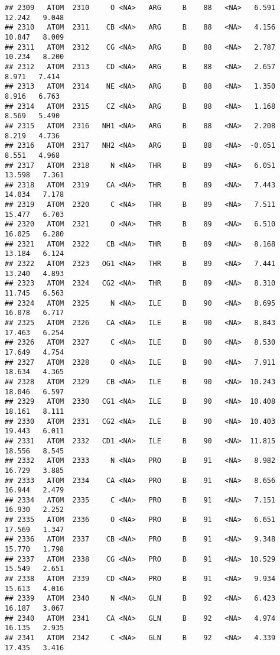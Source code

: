 \documentclass[
]{article}
\begin{document}
\begin{verbatim}
## 2309   ATOM  2310     O <NA>   ARG     B    88   <NA>   6.591  12.242   9.048
## 2310   ATOM  2311    CB <NA>   ARG     B    88   <NA>   4.156  10.847   8.009
## 2311   ATOM  2312    CG <NA>   ARG     B    88   <NA>   2.787  10.234   8.200
## 2312   ATOM  2313    CD <NA>   ARG     B    88   <NA>   2.657   8.971   7.414
## 2313   ATOM  2314    NE <NA>   ARG     B    88   <NA>   1.350   8.916   6.763
## 2314   ATOM  2315    CZ <NA>   ARG     B    88   <NA>   1.168   8.569   5.490
## 2315   ATOM  2316   NH1 <NA>   ARG     B    88   <NA>   2.208   8.219   4.736
## 2316   ATOM  2317   NH2 <NA>   ARG     B    88   <NA>  -0.051   8.551   4.968
## 2317   ATOM  2318     N <NA>   THR     B    89   <NA>   6.051  13.598   7.361
## 2318   ATOM  2319    CA <NA>   THR     B    89   <NA>   7.443  14.034   7.178
## 2319   ATOM  2320     C <NA>   THR     B    89   <NA>   7.511  15.477   6.703
## 2320   ATOM  2321     O <NA>   THR     B    89   <NA>   6.510  16.025   6.280
## 2321   ATOM  2322    CB <NA>   THR     B    89   <NA>   8.168  13.184   6.124
## 2322   ATOM  2323   OG1 <NA>   THR     B    89   <NA>   7.441  13.240   4.893
## 2323   ATOM  2324   CG2 <NA>   THR     B    89   <NA>   8.310  11.745   6.563
## 2324   ATOM  2325     N <NA>   ILE     B    90   <NA>   8.695  16.078   6.717
## 2325   ATOM  2326    CA <NA>   ILE     B    90   <NA>   8.843  17.463   6.254
## 2326   ATOM  2327     C <NA>   ILE     B    90   <NA>   8.530  17.649   4.754
## 2327   ATOM  2328     O <NA>   ILE     B    90   <NA>   7.911  18.634   4.365
## 2328   ATOM  2329    CB <NA>   ILE     B    90   <NA>  10.243  18.046   6.597
## 2329   ATOM  2330   CG1 <NA>   ILE     B    90   <NA>  10.408  18.161   8.111
## 2330   ATOM  2331   CG2 <NA>   ILE     B    90   <NA>  10.403  19.443   6.011
## 2331   ATOM  2332   CD1 <NA>   ILE     B    90   <NA>  11.815  18.556   8.545
## 2332   ATOM  2333     N <NA>   PRO     B    91   <NA>   8.982  16.729   3.885
## 2333   ATOM  2334    CA <NA>   PRO     B    91   <NA>   8.656  16.944   2.479
## 2334   ATOM  2335     C <NA>   PRO     B    91   <NA>   7.151  16.930   2.252
## 2335   ATOM  2336     O <NA>   PRO     B    91   <NA>   6.651  17.569   1.347
## 2336   ATOM  2337    CB <NA>   PRO     B    91   <NA>   9.348  15.770   1.798
## 2337   ATOM  2338    CG <NA>   PRO     B    91   <NA>  10.529  15.549   2.651
## 2338   ATOM  2339    CD <NA>   PRO     B    91   <NA>   9.934  15.613   4.016
## 2339   ATOM  2340     N <NA>   GLN     B    92   <NA>   6.423  16.187   3.067
## 2340   ATOM  2341    CA <NA>   GLN     B    92   <NA>   4.974  16.135   2.935
## 2341   ATOM  2342     C <NA>   GLN     B    92   <NA>   4.339  17.435   3.416

\end{verbatim}
\end{document}
